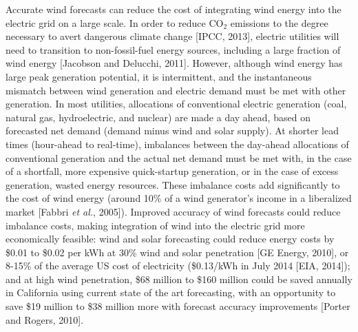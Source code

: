 Accurate wind forecasts can reduce the cost of integrating wind energy into the electric grid on a large scale.  In order to reduce CO$_2$ emissions to the degree necessary to avert dangerous climate change [IPCC, 2013], electric utilities will need to transition to non-fossil-fuel energy sources, including a large fraction of wind energy [Jacobson and Delucchi, 2011].  However, although wind energy has large peak generation potential, it is intermittent, and the instantaneous mismatch between wind generation and electric demand must be met with other generation.  In most utilities, allocations of conventional electric generation (coal, natural gas, hydroelectric, and nuclear) are made a day ahead, based on forecasted net demand (demand minus wind and solar supply).  At shorter lead times (hour-ahead to real-time), imbalances between the day-ahead allocations of conventional generation and the actual net demand must be met with, in the case of a shortfall, more expensive quick-startup generation, or in the case of excess generation, wasted energy resources.  These imbalance costs add significantly to the cost of wind energy (around 10\% of a wind generator's income in a liberalized market [Fabbri \textit{et al.}, 2005]).  Improved accuracy of wind forecasts could reduce imbalance costs, making integration of wind into the electric grid more economically feasible: wind and solar forecasting could reduce energy costs by \$0.01 to \$0.02 per kWh at 30\% wind and solar penetration [GE Energy, 2010], or 8-15\% of the average US cost of electricity (\$0.13/kWh in July 2014 [EIA, 2014]); and at high wind penetration, \$68 million to \$160 million could be saved annually in California using current state of the art forecasting, with an opportunity to save \$19 million to \$38 million more with forecast accuracy improvements [Porter and Rogers, 2010].

